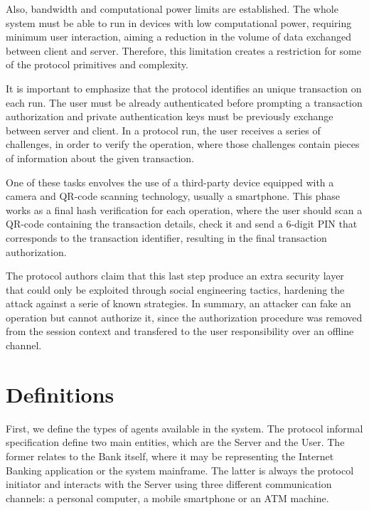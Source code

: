 Also, bandwidth and computational power limits are established. The whole system must be able to run in devices with low computational power, requiring minimum user interaction, aiming a reduction in the volume of data exchanged between client and server. Therefore, this limitation creates a restriction for some of the protocol primitives and complexity.

It is important to emphasize that the protocol identifies an unique transaction on each run. The user must be already authenticated before prompting a transaction authorization and private authentication keys must be previously exchange between server and client. In a protocol run, the user receives a series of challenges, in order to verify the operation, where those challenges contain pieces of information about the given transaction.

One of these tasks envolves the use of a third-party device equipped with a camera and QR-code scanning technology, usually a smartphone. This phase works as a final hash verification for each operation, where the user should scan a QR-code containing the transaction details, check it and send a 6-digit PIN that corresponds to the transaction identifier, resulting in the final transaction authorization.

The protocol authors claim that this last step produce an extra security layer that could only be exploited through social engineering tactics, hardening the attack against a serie of known strategies. In summary, an attacker can fake an operation but cannot authorize it, since the authorization procedure was removed from the session context and transfered to the user responsibility over an offline channel.



















\section{Definitions}

First, we define the types of agents available in the system. The protocol informal specification define two main entities, which are the Server and the User. The former relates to the Bank itself, where it may be representing the Internet Banking application or the system mainframe. The latter is always the protocol initiator and interacts with the Server using three different communication channels: a personal computer, a mobile smartphone or an ATM machine.

